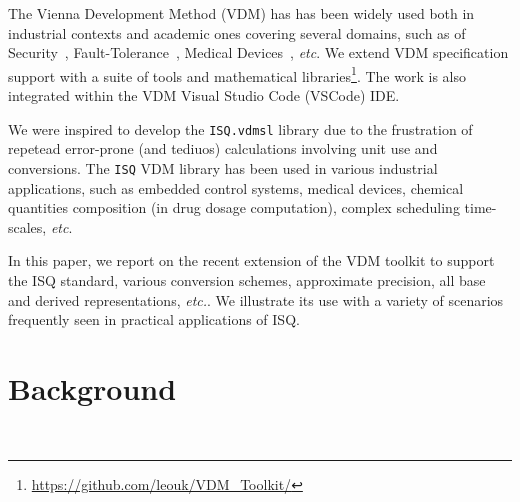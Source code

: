 \documentclass[runningheads,a4paper]{llncs}
\begin{document}
The Vienna Development Method (VDM) has has been widely used both in industrial contexts and academic ones covering several domains, such as of Security~\cite{Kulik&20,Kulik&21a}, Fault-Tolerance~\cite{Nilsson&18}, Medical Devices~\cite{Macedo&08}, \textit{etc}. We extend VDM specification support with a suite of tools and mathematical libraries\footnote{\url{https://github.com/leouk/VDM_Toolkit/}}. The work is also integrated within the VDM Visual Studio Code (VSCode) IDE\@.

We were inspired to develop the \texttt{ISQ.vdmsl} library due to the frustration of repetead error-prone (and tediuos) calculations involving unit use and conversions. The \texttt{ISQ} VDM library has been used in various industrial applications, such as embedded control systems, medical devices, chemical quantities composition (in drug dosage computation), complex scheduling time-scales, \textit{etc}.     

In this paper, we report on the recent extension of the VDM toolkit to support the ISQ standard, various conversion schemes, approximate precision, all base and derived representations, \textit{etc.}. We illustrate its use with a variety of scenarios frequently seen in practical applications of ISQ\@.    

\section{Background}~\label{sec:background}
\end{document}
